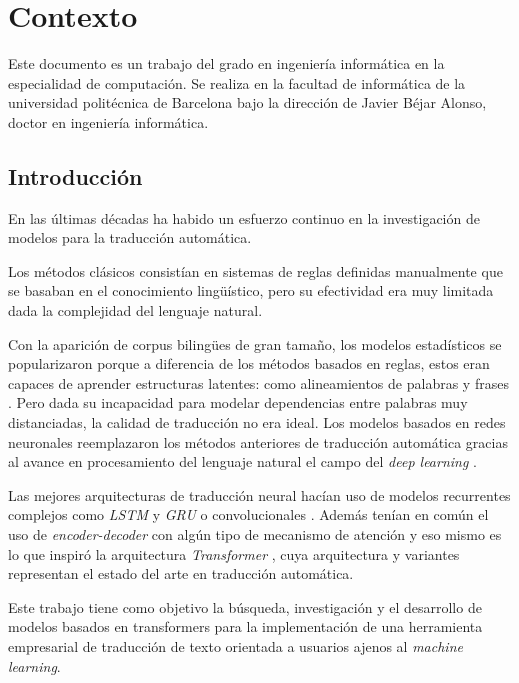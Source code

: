 \chapter{Contexto}
Este documento es un trabajo del grado en ingeniería informática en la especialidad
de computación. Se realiza en la facultad de informática de la universidad politécnica
de Barcelona bajo la dirección de Javier Béjar Alonso, doctor en ingeniería informática.

\section{Introducción}\label{intro}
En las últimas décadas ha habido un esfuerzo continuo en la investigación de modelos para la traducción
automática.

Los métodos clásicos consistían en sistemas de reglas definidas manualmente que se
basaban en el conocimiento lingüístico, pero su efectividad era muy limitada dada la complejidad del lenguaje
natural.

Con la aparición de corpus bilingües de gran tamaño, los modelos estadísticos se popularizaron
porque a diferencia de los métodos basados en reglas, estos eran capaces de aprender
estructuras latentes: como alineamientos de palabras y frases
\cite{HistoryBrown1990ASA, HistoryKoehn2003Jan}. Pero dada su incapacidad para
modelar dependencias entre palabras muy distanciadas, la calidad de traducción no era ideal.
Los modelos basados en redes neuronales \cite{Historykalchbrenner-blunsom-2013, HistoryCho2014Jun,
HistorySutskever2014Sep, HistoryBahdanau2014Sep} reemplazaron los métodos anteriores de
traducción automática gracias al avance en procesamiento del lenguaje natural el campo
del \textit{deep learning} \cite{HistoryTan2020Dec}.

Las mejores arquitecturas de traducción neural hacían uso de modelos recurrentes complejos como
\textit{LSTM} \cite{HistoryHochreiter1997} y \textit{GRU} \cite{HistoryChung2014Dec} o
convolucionales \cite{HistoryGehring2016Nov}. Además tenían en común el uso
de \textit{encoder-decoder} con algún tipo de mecanismo de atención \cite{HistoryBahdanau2014Sep} y
eso mismo es lo que inspiró la arquitectura \textit{Transformer} \cite{Vaswani2017Jun},
cuya arquitectura y variantes representan el estado del arte en traducción automática.

Este trabajo tiene como objetivo la búsqueda, investigación y el desarrollo de modelos
basados en transformers para la implementación de una herramienta
empresarial de traducción de texto orientada a usuarios ajenos al \textit{machine learning}.

